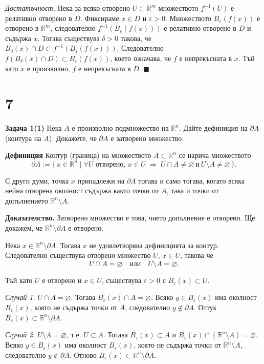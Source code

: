 \documentclass[10pt]{article}
\begin{document}
\textit{Достатъчност.} Нека за всяко отворено $U \subset \mathbb{R}^m$ множеството $f^{-1}(U)$ е релативно отворено в $D$.  
Фиксираме $x \in D$ и $\varepsilon > 0$. Множеството $B_\varepsilon(f(x))$ е отворено в $\mathbb{R}^m$, следователно 
$f^{-1}(B_\varepsilon(f(x)))$ е релативно отворено в $D$ и съдържа $x$.  
Тогава съществува $\delta > 0$ такова, че $B_\delta(x) \cap D \subset f^{-1}(B_\varepsilon(f(x)))$.  
Следователно $f(B_\delta(x) \cap D) \subset B_\varepsilon(f(x))$, което означава, че $f$ е непрекъсната в $x$.  
Тъй като $x$ е произволно, $f$ е непрекъсната в $D$. $\blacksquare$

\section*{7}

\textbf{Задача 1(1) }Нека $A$ е произволно подмножество на $\mathbb{R}^n$. Дайте дефиниция на $\partial A$ (контура на $A$). Докажете, че $\partial A$ е затворено множество.

\textbf{Дефиниция} 
Контур (граница) на множеството $A \subset \mathbb{R}^n$ се нарича множеството
\[
\partial A := \{\, x \in \mathbb{R}^n \mid \forall U \text{ отворено}, \, x \in U \;\Longrightarrow\; 
U \cap A \neq \varnothing \ \text{и} \ U \setminus A \neq \varnothing \,\}.
\]

С други думи, точка $x$ принадлежи на $\partial A$ тогава и само тогава, когато всяка нейна отворена околност съдържа както точки от $A$, така и точки от допълнението $\mathbb{R}^n \setminus A$.


\textbf{Доказателство.} 
Затворено множество е това, чието допълнение е отворено.  
Ще докажем, че $\mathbb{R}^n \setminus \partial A$ е отворено.

Нека $x \in \mathbb{R}^n \setminus \partial A$. Тогава $x$ не удовлетворява дефиницията за контур.  
Следователно съществува отворено множество $U$, $x \in U$, такова че
\[
U \cap A = \varnothing \quad \text{или} \quad U \setminus A = \varnothing.
\]

Тъй като $U$ е отворено и $x \in U$, съществува $\varepsilon > 0$ с $B_\varepsilon(x) \subset U$.

\textit{Случай 1.} $U \cap A = \varnothing$.  
Тогава $B_\varepsilon(x) \cap A = \varnothing$.  
Всяко $y \in B_\varepsilon(x)$ има околност $B_\varepsilon(x)$, която не съдържа точки от $A$, следователно $y \notin \partial A$.  
Оттук $B_\varepsilon(x) \subset \mathbb{R}^n \setminus \partial A$.

\textit{Случай 2.} $U \setminus A = \varnothing$, т.е. $U \subset A$.  
Тогава $B_\varepsilon(x) \subset A$ и $B_\varepsilon(x) \cap (\mathbb{R}^n \setminus A) = \varnothing$.  
Всяко $y \in B_\varepsilon(x)$ има околност $B_\varepsilon(x)$, която не съдържа точки от $\mathbb{R}^n \setminus A$, следователно $y \notin \partial A$.  
Отново $B_\varepsilon(x) \subset \mathbb{R}^n \setminus \partial A$.
\end{document}
